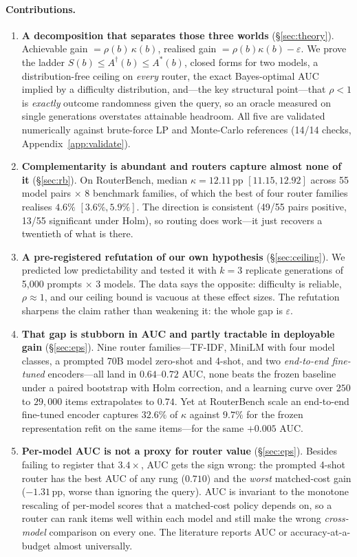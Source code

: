 \documentclass[10pt]{article}
\newcommand{\Sb}{S(b)}
\newcommand{\Adag}{A^{\dagger}(b)}
\newcommand{\Astar}{A^{*}(b)}
\newcommand{\pp}{\,\text{pp}}
\begin{document}
\paragraph{Contributions.}
\begin{enumerate}\itemsep2pt
\item \textbf{A decomposition that separates those three worlds}
(\S\ref{sec:theory}). Achievable gain $=\rho(b)\,\kappa(b)$, realised gain
$=\rho(b)\kappa(b)-\varepsilon$. We prove the ladder $\Sb \le \Adag \le \Astar$,
closed forms for two models, a distribution-free ceiling on \emph{every} router,
the exact Bayes-optimal AUC implied by a difficulty distribution, and---the key
structural point---that $\rho<1$ is \emph{exactly} outcome randomness given the
query, so an oracle measured on single generations overstates attainable
headroom. All five are validated numerically against brute-force LP and
Monte-Carlo references (14/14 checks, Appendix~\ref{app:validate}).
\item \textbf{Complementarity is abundant and routers capture almost none of it}
(\S\ref{sec:rb}). On RouterBench, median $\kappa = 12.11\pp$ $[11.15, 12.92]$
across 55 model pairs $\times$ 8 benchmark families, of which the best of four
router families realises $4.6\%$ $[3.6\%, 5.9\%]$. The direction is consistent
(49/55 pairs positive, 13/55 significant under Holm), so routing does
work---it just recovers a twentieth of what is there.
\item \textbf{A pre-registered refutation of our own hypothesis}
(\S\ref{sec:ceiling}). We predicted low predictability and tested it with $k=3$
replicate generations of 5{,}000 prompts $\times$ 3 models. The data says the
opposite: difficulty is reliable, $\rho\approx1$, and our ceiling bound is
vacuous at these effect sizes. The refutation sharpens the claim rather than
weakening it: the whole gap is $\varepsilon$.
\item \textbf{That gap is stubborn in AUC and partly tractable in deployable
gain} (\S\ref{sec:eps}). Nine router families---TF-IDF, MiniLM with four model
classes, a prompted 70B model zero-shot and 4-shot, and two \emph{end-to-end
fine-tuned} encoders---all land in $0.64$--$0.72$ AUC, none beats the frozen
baseline under a paired bootstrap with Holm correction, and a learning curve
over $250$ to $29{,}000$ items extrapolates to $0.74$. Yet at RouterBench scale
an end-to-end fine-tuned encoder captures $32.6\%$ of $\kappa$ against $9.7\%$
for the frozen representation refit on the same items---for the same $+0.005$
AUC.
\item \textbf{Per-model AUC is not a proxy for router value} (\S\ref{sec:eps}).
Besides failing to register that $3.4\times$, AUC gets the sign wrong: the
prompted 4-shot router has the best AUC of any rung ($0.710$) and the
\emph{worst} matched-cost gain ($-1.31\pp$, worse than ignoring the query). AUC
is invariant to the monotone rescaling of per-model scores that a matched-cost
policy depends on, so a router can rank items well within each model and still
make the wrong \emph{cross-model} comparison on every one. The literature
reports AUC or accuracy-at-a-budget almost universally.
\end{enumerate}
\end{document}
